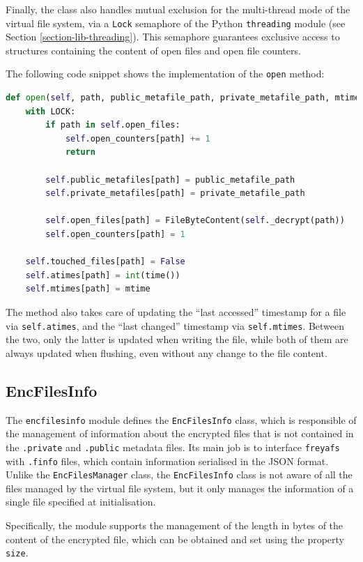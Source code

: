 \documentclass[a4paper,12pt,twoside,openright]{report}
\begin{document}
  Finally, the class also handles mutual exclusion for the multi-thread mode of the virtual file system,
  via a \texttt{Lock} semaphore of the Python \texttt{threading} module (see Section \ref{section-lib-threading}).
  This semaphore guarantees exclusive access to structures containing the content of open files and open file counters.

  The following code snippet shows the implementation of the \texttt{open} method:
  \begin{lstlisting}[language=Python]
  def open(self, path, public_metafile_path, private_metafile_path, mtime):
    with LOCK:
        if path in self.open_files:
            self.open_counters[path] += 1
            return

        self.public_metafiles[path] = public_metafile_path
        self.private_metafiles[path] = private_metafile_path

        self.open_files[path] = FileByteContent(self._decrypt(path))
        self.open_counters[path] = 1
    
    self.touched_files[path] = False
    self.atimes[path] = int(time())
    self.mtimes[path] = mtime
  \end{lstlisting}

  The method also takes care of updating the ``last accessed'' timestamp for a file
  via \texttt{self.atimes}, and the ``last changed'' timestamp via \texttt{self.mtimes}.
  Between the two, only the latter is updated when writing the file, while both of them
  are always updated when flushing, even without any change to the file content.

  \subsection{EncFilesInfo}

  The \texttt{encfilesinfo} module defines the \texttt{EncFilesInfo} class,
  which is responsible of the management of information about the encrypted files that
  is not contained in the \texttt{.private} and \texttt{.public} metadata files.
  Its main job is to interface \texttt{freyafs} with \texttt{.finfo} files,
  which contain information serialised in the JSON format.
  Unlike the \texttt{EncFilesManager} class, the \texttt{EncFilesInfo} class is not aware of
  all the files managed by the virtual file system, but it only manages the information of a single file specified at initialisation.

  Specifically, the module supports the management of the length in bytes of the content of the encrypted file,
  which can be obtained and set using the property \texttt{size}.
  
\end{document}

